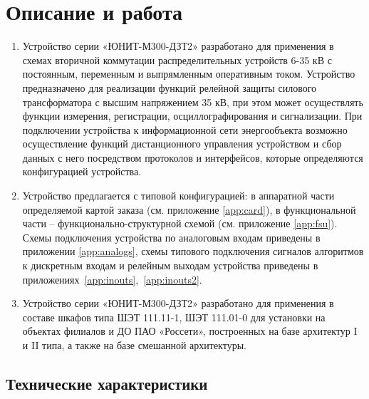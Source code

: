 \color{unimain}\section[Описание и работа]{Описание и работа} %
\color{black}

\color{black}

\begin{enumerate}

\item
Устройство серии «ЮНИТ-М300-ДЗТ2» разработано для применения в схемах вторичной коммутации распределительных устройств 6-35 кВ с постоянным, переменным и выпрямленным оперативным током. Устройство предназначено для реализации функций релейной защиты силового трансформатора с высшим напряжением 35 кВ, при этом может осуществлять функции измерения, регистрации, осциллографирования и сигнализации. При подключении устройства к информационной сети энергообъекта возможно осуществление функций дистанционного управления устройством и сбор данных с него посредством протоколов и интерфейсов, которые определяются конфигурацией устройства.

\item 
Устройство предлагается с типовой конфигурацией: в аппаратной части определяемой картой заказа (см. приложение \ref{app:card}), в функциональной части -- функционально-структурной схемой (см. приложение \ref{app:fsu}). Схемы подключения устройства по аналоговым входам приведены в приложении \ref{app:analogs}, схемы типового подключения сигналов алгоритмов к дискретным входам и релейным выходам устройства приведены в приложениях~\ref{app:inouts},~\ref{app:inouts2}.

\item
Устройство серии «ЮНИТ-М300-ДЗТ2» разработано для применения в составе шкафов типа ШЭТ 111.11-1, ШЭТ 111.01-0 для установки на объектах филиалов и ДО ПАО «Россети», построенных на базе архитектур I и II типа, а также на базе смешанной архитектуры.

\end{enumerate}


\color{unimain}\subsection{Технические характеристики}
\color{black}

